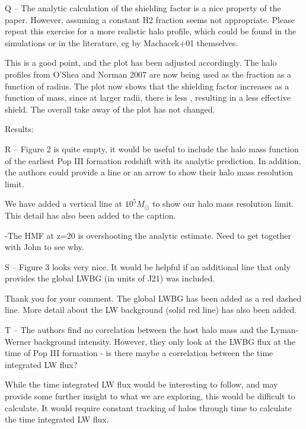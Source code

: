 \documentclass[11pt]{article}
\newenvironment{referee}[1][]{%
    \ignorespaces%
    \begin{mdframed}[style=myquotestyle,#1]%
}{%
    \end{mdframed}%
    \ignorespacesafterend%
}%
\begin{document}
\begin{referee}
Q -- The analytic calculation of the shielding factor is a nice property of the paper. However, assuming a constant H2 fraction seems not appropriate. Please repeat this exercise for a more realistic halo profile, which could be found in the simulations or in the literature, eg by Machacek+01 themselves.
\end{referee}
This is a good point, and the plot has been adjusted accordingly. The halo profiles from O'Shea and Norman 2007 are now being used as the \hh{} fraction as a function of radius. The plot now shows that the shielding factor increases as a function of mass, since at larger radii, there is less \hh{}, resulting in a less effective \hh{} shield. The overall take away of the plot has not changed. 

\begin{referee}
Results:

R -- Figure 2 is quite empty, it would be useful to include the halo mass function of the earliest Pop III formation redshift with its analytic prediction. In addition, the authors could provide a line or an arrow to show their halo mass resolution limit.
\end{referee}
We have added a vertical line at $10^5 M_{\odot}$ to show our halo mass resolution limit. This detail has also been added to the caption.

-The HMF at z=20 is overshooting the analytic estimate. Need to get together with John to see why. 


\begin{referee}
S -- Figure 3 looks very nice. It would be helpful if an additional line that only 
provides the global LWBG (in units of J21) was included.
\end{referee}
Thank you for your comment. The global LWBG has been added as a red dashed line. More detail about the LW background (solid red line) has also been added.

\begin{referee}
T -- The authors find no correlation between the host halo mass and the Lyman-Werner background intensity. However, they only look at the LWBG flux at the time of Pop III formation - is there maybe a correlation between the time integrated LW flux?
\end{referee}
While the time integrated LW flux would be interesting to follow, and may provide some further insight to what we are exploring, this would be difficult to calculate. It would require constant tracking of halos through time to calculate the time integrated LW flux. 
\end{document}
